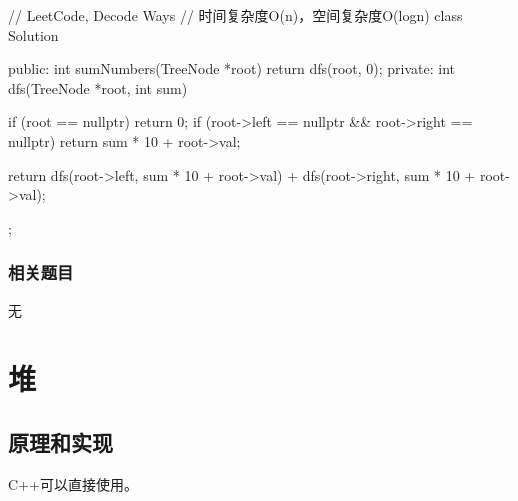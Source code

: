 \begin{Code}
	// LeetCode, Decode Ways
	// 时间复杂度O(n)，空间复杂度O(logn)
	class Solution {
		public:
		int sumNumbers(TreeNode *root) {
			return dfs(root, 0);
		}
		private:
		int dfs(TreeNode *root, int sum) {
			if (root == nullptr) return 0;
			if (root->left == nullptr && root->right == nullptr)
			return sum * 10 + root->val;
			
			return dfs(root->left, sum * 10 + root->val) +
			dfs(root->right, sum * 10 + root->val);
		}
	};
\end{Code}


\subsubsection{相关题目}
\begindot
\item 无
\myenddot


\section{堆} %

\subsection{原理和实现}
C++可以直接使用。

